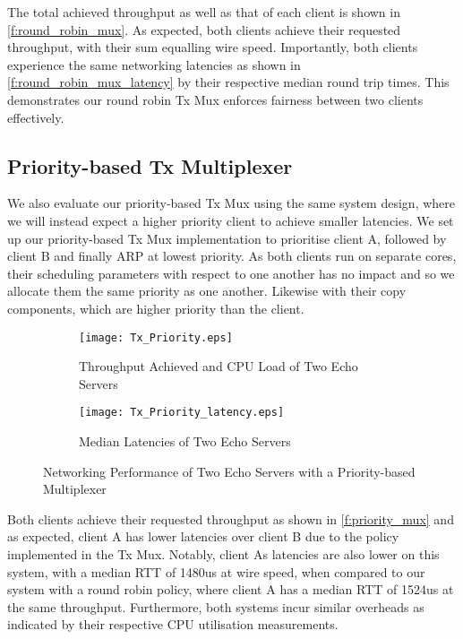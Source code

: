 The total achieved throughput as well as that of each client is shown in \autoref{f:round_robin_mux}. As expected, both clients achieve their 
requested throughput, with their sum equalling wire speed. Importantly, both clients experience the same networking latencies as shown
in \autoref{f:round_robin_mux_latency} by their respective median round trip times. This demonstrates our round robin Tx Mux enforces
fairness between two clients effectively.

\subsection{Priority-based Tx Multiplexer}

We also evaluate our priority-based Tx Mux using the same system design, where we will instead expect a higher priority client to achieve smaller
latencies. We set up our priority-based Tx Mux implementation to prioritise client A, followed by client B and finally ARP at lowest priority.
As both clients run on separate cores, their scheduling parameters with respect to one another has no impact and so we allocate them the same
priority as one another. Likewise with their copy components, which are higher priority than the client. 

\noindent\begin{figure}[h]
    \centering
	\begin{multicols}{2}
		\begin{subfigure}[b]{0.45\textwidth}
        \centering
        \texttt{[image: Tx\_Priority.eps]}
        \caption{Throughput Achieved and CPU Load of Two Echo Servers}
        \label{f:priority_mux}
    \end{subfigure}\qquad
    \begin{subfigure}[b]{0.45\textwidth}
        \vspace{52pt}
        \centering
        \texttt{[image: Tx\_Priority\_latency.eps]}
        \vspace{0.5pt}
        \caption{Median Latencies of Two Echo Servers}
        \label{f:priority_latency}
    \end{subfigure}
\end{multicols}
\caption{Networking Performance of Two Echo Servers with a Priority-based Multiplexer}
\end{figure}

Both clients achieve their requested throughput as shown in \autoref{f:priority_mux} and as expected, client A has lower latencies
over client B due to the policy implemented in the Tx Mux. Notably, client As latencies are also lower on this system, with a median RTT
of 1480us at wire speed, when compared to our system with a round robin policy, where client A has a median RTT of 1524us at the same
throughput. 
Furthermore, both systems incur similar overheads as indicated by their respective CPU utilisation measurements. 


